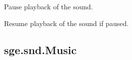 \documentclass[letterpaper,10pt,english]{sphinxmanual}
\begin{document}

\begin{fulllineitems}
\label{snd:sge.snd.Sound.pause}
Pause playback of the sound.

\end{fulllineitems}


\begin{fulllineitems}
\label{snd:sge.snd.Sound.unpause}
Resume playback of the sound if paused.

\end{fulllineitems}



\subsection{sge.snd.Music}
\label{snd:sge-snd-music}
\end{document}
